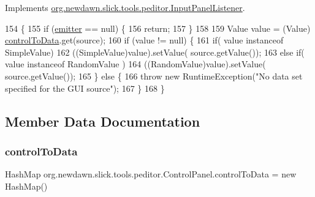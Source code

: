Implements \mbox{\hyperlink{interfaceorg_1_1newdawn_1_1slick_1_1tools_1_1peditor_1_1_input_panel_listener_acd0102f73058e7c2e899297962b0fa11}{org.\+newdawn.\+slick.\+tools.\+peditor.\+Input\+Panel\+Listener}}.


\begin{DoxyCode}
154                                                 \{
155         \textcolor{keywordflow}{if} (\mbox{\hyperlink{classorg_1_1newdawn_1_1slick_1_1tools_1_1peditor_1_1_control_panel_aaa170169fa574cb6b271f782afcd2517}{emitter}} == null) \{
156             \textcolor{keywordflow}{return};
157         \}
158         
159         Value value = (Value) \mbox{\hyperlink{classorg_1_1newdawn_1_1slick_1_1tools_1_1peditor_1_1_control_panel_a7316bd7b85c2e289dbafe9b65e33a474}{controlToData}}.get(source);
160         \textcolor{keywordflow}{if} (value != null) \{
161             \textcolor{keywordflow}{if}( value instanceof SimpleValue)
162                 ((SimpleValue)value).setValue( source.getValue());
163             \textcolor{keywordflow}{else} \textcolor{keywordflow}{if}( value instanceof RandomValue )
164                 ((RandomValue)value).setValue( source.getValue());
165         \} \textcolor{keywordflow}{else} \{
166             \textcolor{keywordflow}{throw} \textcolor{keyword}{new} RuntimeException(\textcolor{stringliteral}{"No data set specified for the GUI source"});
167         \}
168     \}
\end{DoxyCode}


\subsection{Member Data Documentation}
\mbox{\label{classorg_1_1newdawn_1_1slick_1_1tools_1_1peditor_1_1_control_panel_a7316bd7b85c2e289dbafe9b65e33a474}} 
\subsubsection{\texorpdfstring{control\+To\+Data}{controlToData}}
{\footnotesize\ttfamily Hash\+Map org.\+newdawn.\+slick.\+tools.\+peditor.\+Control\+Panel.\+control\+To\+Data = new Hash\+Map()\hspace{0.3cm}{\ttfamily [protected]}}

